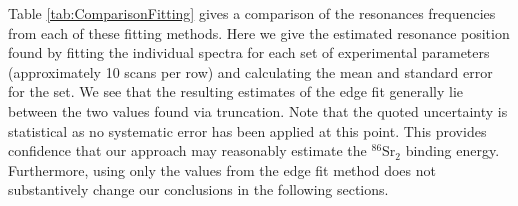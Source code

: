 Table \ref{tab:ComparisonFitting} gives a comparison of the resonances frequencies from each of these fitting methods.
Here we give the estimated resonance position found by fitting the individual spectra for each set of experimental parameters (approximately 10 scans per row) and calculating the mean and standard error for the set.
We see that the resulting estimates of the edge fit generally lie between the two values found via truncation.
Note that the quoted uncertainty is statistical as no systematic error has been applied at this point.
This provides confidence that our approach may reasonably estimate the $^{86}$Sr$_2$ binding energy.
Furthermore, using only the values from the edge fit method does not substantively change our conclusions in the following sections.
	\begin{table}[]
		\centering
\end{table}
